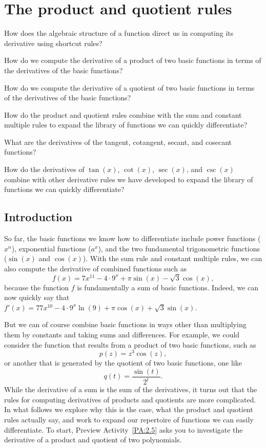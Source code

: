 \section{The product and quotient rules} \label{S:2.5.ProdQuot}

\begin{goals}
\item How does the algebraic structure of a function direct us in computing its derivative using shortcut rules?
\item How do we compute the derivative of a product of two basic functions in terms of the derivatives of the basic functions?
\item How do we compute the derivative of a quotient of two basic functions in terms of the derivatives of the basic functions?
\item How do the product and quotient rules combine with the sum and constant multiple rules to expand the library of functions we can quickly differentiate?
\item What are the derivatives of the tangent, cotangent, secant, and cosecant functions?
\item How do the derivatives of $\tan(x)$, $\cot(x)$, $\sec(x)$, and $\csc(x)$ combine with other derivative rules we have developed to expand the library of functions we can quickly differentiate?
\end{goals}

\subsection*{Introduction}

So far, the basic functions we know how to differentiate include power functions ($x^n$), exponential functions ($a^x$), and the two fundamental trigonometric functions ($\sin(x)$ and $\cos(x)$).  With the sum rule and constant multiple rules, we can also compute the derivative of combined functions such as
$$f(x) = 7x^{11} - 4 \cdot 9^x + \pi \sin(x) - \sqrt{3}\cos(x),$$
because the function $f$ is fundamentally a sum of basic functions.  Indeed, we can now quickly say that $f'(x) = 77x^{10} - 4 \cdot 9^x \ln(9) + \pi \cos(x) + \sqrt{3} \sin(x)$.  

But we can of course combine basic functions in ways other than multiplying them by constants and taking sums and differences.  For example, we could consider the function that results from a product of two basic functions, such as $$p(z) = z^3 \cos(z),$$
or another that is generated by the quotient of two basic functions, one like
$$q(t) = \frac{\sin(t)}{2^t}.$$
While the derivative of a sum is the sum of the derivatives, it turns out that the rules for computing derivatives of products and quotients are more complicated.  In what follows we explore why this is the case, what the product and quotient rules actually say, and work to expand our repertoire of functions we can easily differentiate.  To start, Preview Activity~\ref{PA:2.5} asks you to investigate the derivative of a product and quotient of two polynomials.

